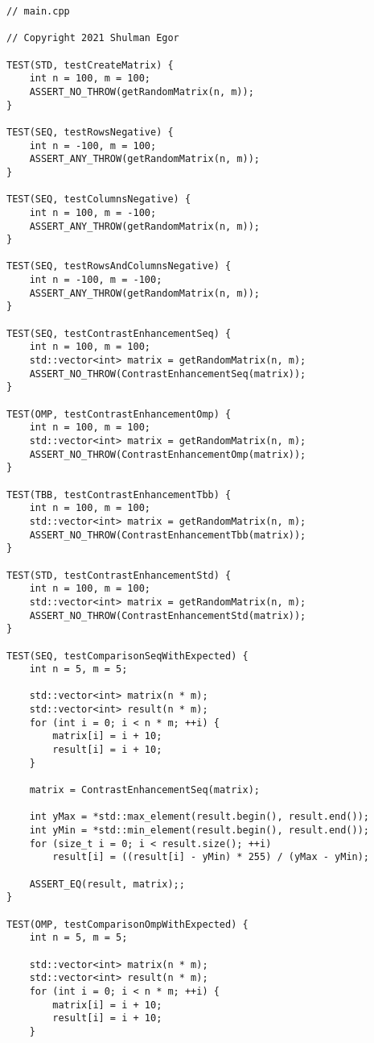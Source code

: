\documentclass{report}
\begin{document}
\begin{lstlisting}
// main.cpp

// Copyright 2021 Shulman Egor

TEST(STD, testCreateMatrix) {
    int n = 100, m = 100;
    ASSERT_NO_THROW(getRandomMatrix(n, m));
}

TEST(SEQ, testRowsNegative) {
    int n = -100, m = 100;
    ASSERT_ANY_THROW(getRandomMatrix(n, m));
}

TEST(SEQ, testColumnsNegative) {
    int n = 100, m = -100;
    ASSERT_ANY_THROW(getRandomMatrix(n, m));
}

TEST(SEQ, testRowsAndColumnsNegative) {
    int n = -100, m = -100;
    ASSERT_ANY_THROW(getRandomMatrix(n, m));
}

TEST(SEQ, testContrastEnhancementSeq) {
    int n = 100, m = 100;
    std::vector<int> matrix = getRandomMatrix(n, m);
    ASSERT_NO_THROW(ContrastEnhancementSeq(matrix));
}

TEST(OMP, testContrastEnhancementOmp) {
    int n = 100, m = 100;
    std::vector<int> matrix = getRandomMatrix(n, m);
    ASSERT_NO_THROW(ContrastEnhancementOmp(matrix));
}

TEST(TBB, testContrastEnhancementTbb) {
    int n = 100, m = 100;
    std::vector<int> matrix = getRandomMatrix(n, m);
    ASSERT_NO_THROW(ContrastEnhancementTbb(matrix));
}

TEST(STD, testContrastEnhancementStd) {
    int n = 100, m = 100;
    std::vector<int> matrix = getRandomMatrix(n, m);
    ASSERT_NO_THROW(ContrastEnhancementStd(matrix));
}

TEST(SEQ, testComparisonSeqWithExpected) {
    int n = 5, m = 5;

    std::vector<int> matrix(n * m);
    std::vector<int> result(n * m);
    for (int i = 0; i < n * m; ++i) {
        matrix[i] = i + 10;
        result[i] = i + 10;
    }

    matrix = ContrastEnhancementSeq(matrix);

    int yMax = *std::max_element(result.begin(), result.end());
    int yMin = *std::min_element(result.begin(), result.end());
    for (size_t i = 0; i < result.size(); ++i)
        result[i] = ((result[i] - yMin) * 255) / (yMax - yMin);

    ASSERT_EQ(result, matrix);;
}

TEST(OMP, testComparisonOmpWithExpected) {
    int n = 5, m = 5;

    std::vector<int> matrix(n * m);
    std::vector<int> result(n * m);
    for (int i = 0; i < n * m; ++i) {
        matrix[i] = i + 10;
        result[i] = i + 10;
    }


\end{lstlisting}
\end{document}

